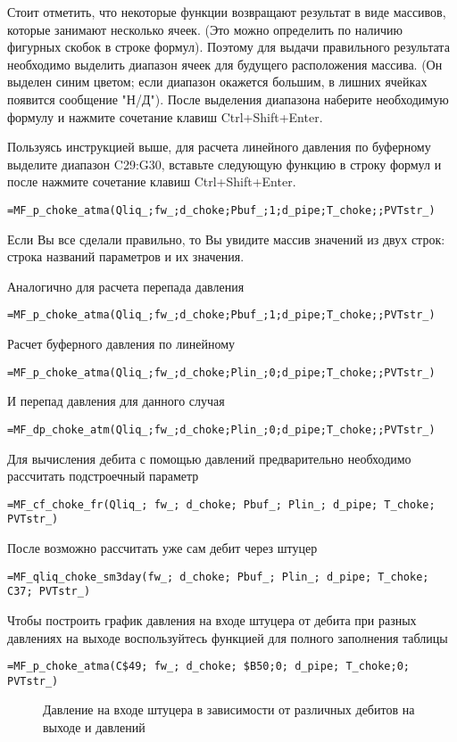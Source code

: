 Стоит отметить, что некоторые функции возвращают результат в виде массивов, которые занимают несколько ячеек. (Это можно определить по наличию фигурных скобок в строке формул). Поэтому для выдачи правильного результата необходимо выделить диапазон ячеек для будущего расположения массива. (Он выделен синим цветом; если диапазон окажется большим, в лишних ячейках появится сообщение "Н/Д"). После выделения диапазона наберите необходимую формулу и нажмите сочетание клавиш Ctrl+Shift+Enter.

Пользуясь инструкцией выше, для расчета линейного давления по буферному выделите диапазон C29:G30, вставьте следующую функцию в строку формул и после нажмите сочетание клавиш Ctrl+Shift+Enter.

{ \small  \texttt{=MF\_p\_choke\_atma(Qliq\_;fw\_;d\_choke;Pbuf\_;1;d\_pipe;T\_choke;;PVTstr\_)}}

Если Вы все сделали правильно, то Вы увидите массив значений из двух строк: строка названий параметров и их значения.

Аналогично для расчета перепада давления 

{ \small  \texttt{=MF\_p\_choke\_atma(Qliq\_;fw\_;d\_choke;Pbuf\_;1;d\_pipe;T\_choke;;PVTstr\_)}}

Расчет буферного давления по линейному

{ \small  \texttt{=MF\_p\_choke\_atma(Qliq\_;fw\_;d\_choke;Plin\_;0;d\_pipe;T\_choke;;PVTstr\_)
}}

И перепад давления для данного случая

{ \small  \texttt{=MF\_dp\_choke\_atm(Qliq\_;fw\_;d\_choke;Plin\_;0;d\_pipe;T\_choke;;PVTstr\_)
}}

Для вычисления дебита с помощью давлений предварительно необходимо рассчитать подстроечный параметр

{ \small  \texttt{=MF\_cf\_choke\_fr(Qliq\_; fw\_; d\_choke; Pbuf\_; Plin\_; d\_pipe; T\_choke; PVTstr\_)
}}

После возможно рассчитать уже сам дебит через штуцер

{ \small  \texttt{=MF\_qliq\_choke\_sm3day(fw\_; d\_choke; Pbuf\_; Plin\_; d\_pipe; T\_choke; C37; PVTstr\_)
}}

Чтобы построить график давления на входе штуцера от дебита при разных давлениях на выходе воспользуйтесь функцией для полного заполнения таблицы

{ \small  \texttt{=MF\_p\_choke\_atma(C\$49; fw\_; d\_choke; \$B50;0; d\_pipe; T\_choke;0; PVTstr\_)
}}


\begin{figure}[h!]
	\center{\texttt{[image: Ex40\_3]}}
	\caption{Давление на входе штуцера в зависимости от различных дебитов на выходе и давлений}
	\label{ris:Ex40_3}
\end{figure}


